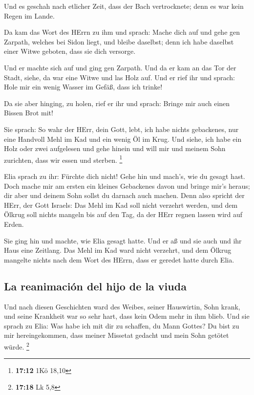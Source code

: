  Und es geschah nach etlicher Zeit, dass der Bach
vertrocknete; denn es war kein Regen im Lande.

 Da kam das Wort des HErrn zu ihm und sprach:
 Mache dich auf und gehe gen Zarpath, welches bei Sidon
liegt, und bleibe daselbst; denn ich habe daselbst einer Witwe geboten,
dass sie dich versorge.

 Und er machte sich auf und ging gen Zarpath. Und da er
kam an das Tor der Stadt, siehe, da war eine Witwe und las Holz auf. Und
er rief ihr und sprach: Hole mir ein wenig Wasser im Gefäß, dass ich
trinke!

 Da sie aber hinging, zu holen, rief er ihr und sprach:
Bringe mir auch einen Bissen Brot mit!

 Sie sprach: So wahr der HErr, dein Gott, lebt, ich habe
nichts gebackenes, nur eine Handvoll Mehl im Kad und ein wenig Öl im
Krug. Und siehe, ich habe ein Holz oder zwei aufgelesen und gehe hinein
und will mir und meinem Sohn zurichten, dass wir essen und sterben.
\footnote{\textbf{17:12} 1Kö 18,10}

 Elia sprach zu ihr: Fürchte dich nicht! Gehe hin und
mach's, wie du gesagt hast. Doch mache mir am ersten ein kleines
Gebackenes davon und bringe mir's heraus; dir aber und deinem Sohn
sollst du darnach auch machen.  Denn also spricht der
HErr, der Gott Israels: Das Mehl im Kad soll nicht verzehrt werden, und
dem Ölkrug soll nichts mangeln bis auf den Tag, da der HErr regnen
lassen wird auf Erden.

 Sie ging hin und machte, wie Elia gesagt hatte. Und er
aß und sie auch und ihr Haus eine Zeitlang.  Das Mehl im
Kad ward nicht verzehrt, und dem Ölkrug mangelte nichts nach dem Wort
des HErrn, dass er geredet hatte durch Elia.

\hypertarget{la-reanimaciuxf3n-del-hijo-de-la-viuda}{%
\subsection{La reanimación del hijo de la
viuda}\label{la-reanimaciuxf3n-del-hijo-de-la-viuda}}

 Und nach diesen Geschichten ward des Weibes, seiner
Hauswirtin, Sohn krank, und seine Krankheit war so sehr hart, dass kein
Odem mehr in ihm blieb.  Und sie sprach zu Elia: Was habe
ich mit dir zu schaffen, du Mann Gottes? Du bist zu mir hereingekommen,
dass meiner Missetat gedacht und mein Sohn getötet würde. \footnote{\textbf{17:18}
  Lk 5,8}

